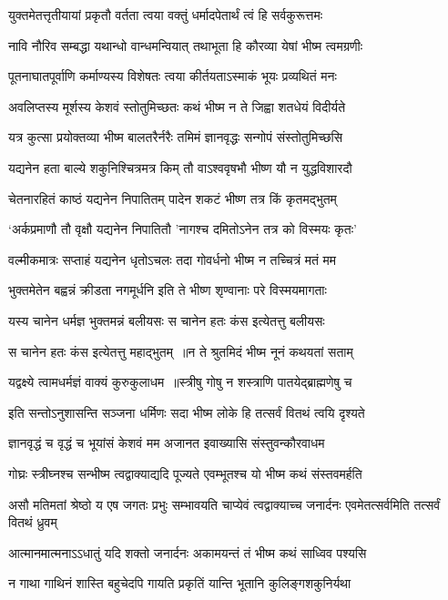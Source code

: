 \twolineshloka
{युक्तमेतत्तृतीयायां प्रकृतौ वर्तता त्वया}
{वक्तुं धर्मादपेतार्थं त्वं हि सर्वकुरूत्तमः}


\twolineshloka
{नावि नौरिव सम्बद्धा यथान्धो वान्धमन्वियात्}
{तथाभूता हि कौरव्या येषां भीष्म त्वमग्रणीः}


\twolineshloka
{पूतनाघातपूर्वाणि कर्माण्यस्य विशेषतः}
{त्वया कीर्तयताऽस्माकं भूयः प्रव्यथितं मनः}


\twolineshloka
{अवलिप्तस्य मूर्शस्य केशवं स्तोतुमिच्छतः}
{कथं भीष्म न ते जिह्वा शतधेयं विदीर्यते}


\twolineshloka
{यत्र कुत्सा प्रयोक्तव्या भीष्म बालतरैर्नरैः}
{तमिमं ज्ञानवृद्धः सन्गोपं संस्तोतुमिच्छसि}


\twolineshloka
{यद्यनेन हता बाल्ये शकुनिश्चित्रमत्र किम्}
{तौ वाऽश्ववृषभौ भीष्ण यौ न युद्धविशारदौ}


\twolineshloka
{चेतनारहितं काष्ठं यद्यनेन निपातितम्}
{पादेन शकटं भीष्ण तत्र किं कृतमद्भुतम्}


\twolineshloka
{`अर्कप्रमाणौ तौ वृक्षौ यद्यनेन निपातितौ}
{'नागश्च दमितोऽनेन तत्र को विस्मयः कृतः'}


\twolineshloka
{वल्मीकमात्रः सप्ताहं यद्यनेन धृतोऽचलः}
{तदा गोवर्धनो भीष्म न तच्चित्रं मतं मम}


\twolineshloka
{भुक्तमेतेन बह्वन्नं क्रीडता नगमूर्धनि}
{इति ते भीष्ण शृण्वानाः परे विस्मयमागताः}


\threelineshloka
{यस्य चानेन धर्मज्ञ भुक्तमन्नं बलीयसः}
{स चानेन हतः कंस इत्येतत्तु बलीयसः}
{}


\twolineshloka
{स चानेन हतः कंस इत्येतत्तु महाद्भुतम् ॥न ते श्रुतमिदं भीष्म नूनं कथयतां सताम्}
{}


\twolineshloka
{यद्वक्ष्ये त्वामधर्मज्ञं वाक्यं कुरुकुलाधम ॥स्त्रीषु गोषु न शस्त्राणि पातयेद्ब्राह्मणेषु च}
{}


\twolineshloka
{इति सन्तोऽनुशासन्ति सञ्जना धर्मिणः सदा}
{भीष्म लोके हि तत्सर्वं वितथं त्वयि दृश्यते}


\twolineshloka
{ज्ञानवृद्धं च वृद्धं च भूयांसं केशवं मम}
{अजानत इवाख्यासि संस्तुवन्कौरवाधम}


\twolineshloka
{गोघ्रः स्त्रीघ्नश्च सन्भीष्म त्वद्वाक्याद्यदि पूज्यते}
{एवम्भूतश्च यो भीष्म कथं संस्तवमर्हति}


\threelineshloka
{असौ मतिमतां श्रेष्ठो य एष जगतः प्रभुः}
{सम्भावयति चाप्येवं त्वद्वाक्याच्च जनार्दनः}
{एवमेतत्सर्वमिति तत्सर्वं वितथं ध्रुवम्}


\twolineshloka
{आत्मानमात्मनाऽऽधातुं यदि शक्तो जनार्दनः}
{अकामयन्तं तं भीष्म कथं साध्विव पश्यसि}


\twolineshloka
{न गाथा गाथिनं शास्ति बहुचेदपि गायति}
{प्रकृतिं यान्ति भूतानि कुलिङ्गशकुनिर्यथा}


